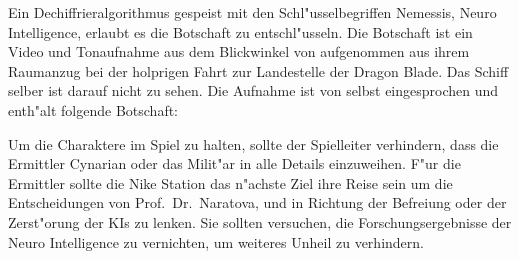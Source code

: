 Ein Dechiffrieralgorithmus gespeist mit den Schl"usselbegriffen Nemessis, Neuro Intelligence, \xl{} erlaubt es die Botschaft zu entschl"usseln. Die Botschaft ist ein Video und Tonaufnahme aus dem Blickwinkel von \ml{} aufgenommen aus ihrem Raumanzug bei der holprigen Fahrt zur Landestelle der Dragon Blade. Das Schiff selber ist darauf nicht zu sehen. Die Aufnahme ist von \ml{} selbst eingesprochen und enth"alt folgende Botschaft:


\begin{remarks}
	Um die Charaktere im Spiel zu halten, sollte der Spielleiter verhindern, dass die Ermittler Cynarian oder das Milit"ar in alle Details einzuweihen. F"ur die Ermittler sollte die Nike Station das n"achste Ziel ihre Reise sein um die Entscheidungen von Prof.~Dr.~Naratova, \ml{} und \xl{} in Richtung der Befreiung oder der Zerst"orung der KIs zu lenken. Sie sollten versuchen, die Forschungsergebnisse der Neuro Intelligence zu vernichten, um weiteres Unheil zu verhindern.
\end{remarks}
